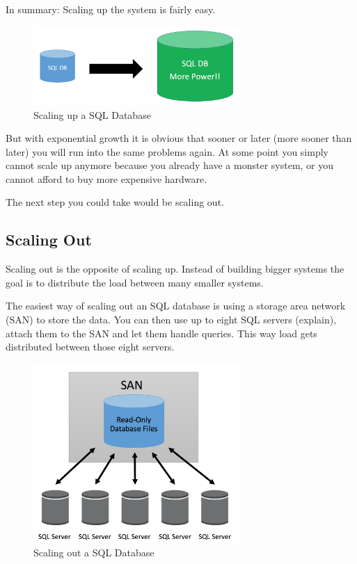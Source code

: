 \documentclass[12pt, numbers=noenddot]{scrreprt} %
\begin{document}
In summary: Scaling up the system is fairly easy.

\begin{figure}[htbp]
  \centering
     \includegraphics[width=0.7\textwidth]{images/SQL-Scaling-UP.png}
  \caption{Scaling up a SQL Database}
  \label{fig:Bild1}
\end{figure}

But with exponential growth it is obvious that sooner or later (more sooner than later) you will run into the same problems again. At some point you simply cannot scale up anymore because you already have a monster system, or you cannot afford to buy more expensive hardware.

The next step you could take would be scaling out.

\subsection{Scaling Out}
Scaling out is the opposite of scaling up. Instead of building bigger systems the goal is to distribute the load between many smaller systems.

The easiest way of scaling out an SQL database is using a storage area network (SAN) to store the data. You can then use up to eight SQL servers (explain), attach them to the SAN and let them handle queries. This way load gets distributed between those eight servers.

\begin{figure}[htbp]
  \centering
     \includegraphics[width=0.7\textwidth]{images/SQL-Scaling-Out.png}
  \caption{Scaling out a SQL Database}
  \label{fig:Bild1}
\end{figure}
\end{document}
